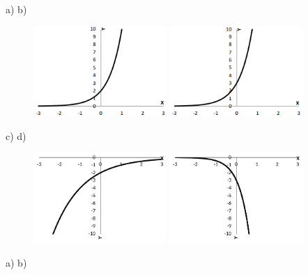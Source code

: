 \begin{respostas}{3}
\ansitem{} a) \tab b)

\begin{figure}[H]
    \includegraphics[width=0.45\textwidth]{capitulos/potencias_e_funcoes_exponenciais/media/image29.png} 
    \includegraphics[width=0.45\textwidth]{capitulos/potencias_e_funcoes_exponenciais/media/image30.png}
\end{figure}

c) \tab d)

\begin{figure}[H]
    \includegraphics[width=0.45\textwidth]{capitulos/potencias_e_funcoes_exponenciais/media/image31.pdf} 
    \includegraphics[width=0.45\textwidth]{capitulos/potencias_e_funcoes_exponenciais/media/image32.pdf}
\end{figure}

\ansitem{} a) \tab b)


\end{respostas}
